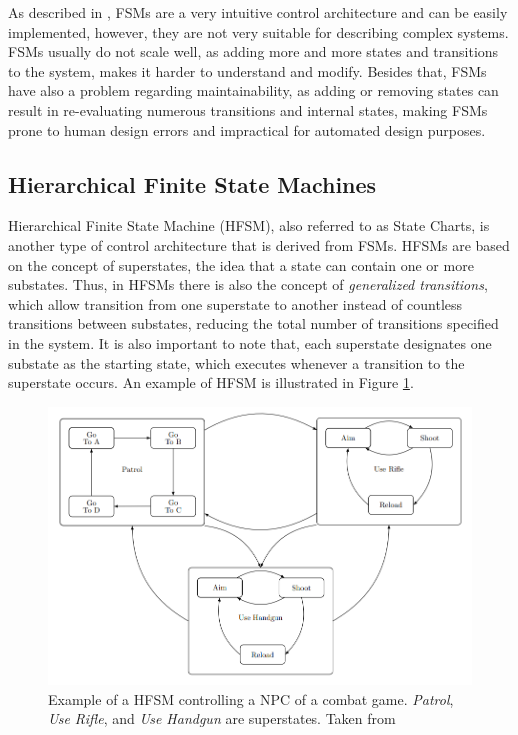 As described in \cite{BTsInRobotics}, FSMs are a very intuitive control architecture and can be easily implemented, however, they are not very suitable for describing complex systems. FSMs usually do not scale well, as adding more and more states and transitions to the system, makes it harder to understand and modify. Besides that, FSMs have also a problem regarding maintainability, as adding or removing states can result in re-evaluating numerous transitions and internal states, making FSMs prone to human design errors and impractical for automated design purposes.

\subsection{Hierarchical Finite State Machines}

Hierarchical Finite State Machine (HFSM), also referred to as State Charts, is another type of control architecture that is derived from FSMs. HFSMs are based on the concept of superstates, the idea that a state can contain one or more substates. Thus, in HFSMs there is also the concept of \textit{generalized transitions}, which allow transition from one superstate to another instead of countless transitions between substates, reducing the total number of transitions specified in the system. It is also important to note that, each superstate designates one substate as the starting state, which executes whenever a transition to the superstate occurs. An example of HFSM is illustrated in Figure \ref{fig:hfsm_example}.

\begin{figure}
    \centering
    \includegraphics[width=0.75\linewidth]{chapters/background/images/HFSM Example.png}
    \caption{Example of a HFSM controlling a NPC of a combat game. \textit{Patrol}, \textit{Use Rifle}, and \textit{Use Handgun} are superstates. Taken from \cite{BTsInRobotics}}
    \label{fig:hfsm_example}
\end{figure}


